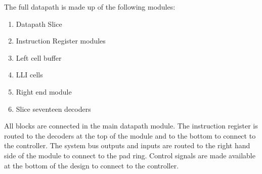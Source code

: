 
The full datapath is made up of the following modules:
\begin{enumerate}
\item Datapath Slice
\item Instruction Register modules
\item Left cell buffer
\item LLI cells
\item Right end module
\item Slice seventeen decoders
\end{enumerate}

All blocks are connected in the main datapath module.
The instruction register is routed to the decoders at the top of the module and to the bottom to connect to the controller. 
The system bus outputs and inputs are routed to the right hand side of the module to connect to the pad ring.
Control signals are made available at the bottom of the design to connect to the controller. 

%

